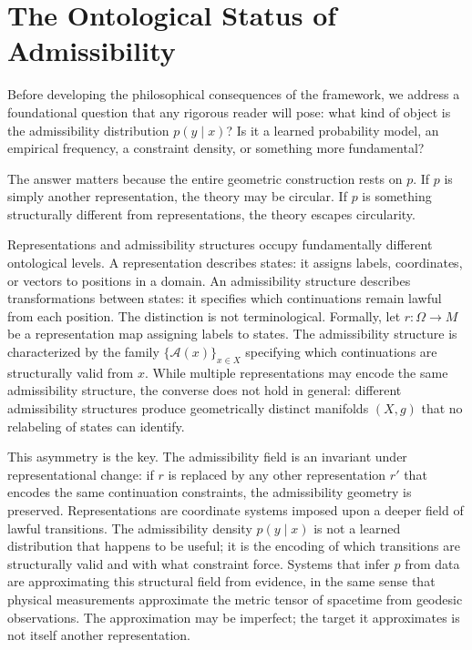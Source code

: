 \documentclass[12pt, oneside]{book}
\theoremstyle{plain-flyxion}
\theoremstyle{definition-flyxion}
\newcommand{\A}{\mathcal{A}}
\begin{document}
\section{The Ontological Status of Admissibility}

Before developing the philosophical consequences of the framework, we address a
foundational question that any rigorous reader will pose: what kind of object is the
admissibility distribution $p(y \mid x)$? Is it a learned probability model, an empirical
frequency, a constraint density, or something more fundamental?

The answer matters because the entire geometric construction rests on $p$. If $p$ is
simply another representation, the theory may be circular. If $p$ is something
structurally different from representations, the theory escapes circularity.

Representations and admissibility structures occupy fundamentally different ontological
levels. A representation describes states: it assigns labels, coordinates, or vectors to
positions in a domain. An admissibility structure describes transformations between states:
it specifies which continuations remain lawful from each position. The distinction is not
terminological. Formally, let $r: \Omega \to M$ be a representation map assigning labels
to states. The admissibility structure is characterized by the family $\{\A(x)\}_{x \in
X}$ specifying which continuations are structurally valid from $x$. While multiple
representations may encode the same admissibility structure, the converse does not hold
in general: different admissibility structures produce geometrically distinct manifolds
$(X, g)$ that no relabeling of states can identify.

This asymmetry is the key. The admissibility field is an invariant under representational
change: if $r$ is replaced by any other representation $r'$ that encodes the same
continuation constraints, the admissibility geometry is preserved. Representations are
coordinate systems imposed upon a deeper field of lawful transitions. The admissibility
density $p(y \mid x)$ is not a learned distribution that happens to be useful; it is the
encoding of which transitions are structurally valid and with what constraint force.
Systems that infer $p$ from data are approximating this structural field from evidence,
in the same sense that physical measurements approximate the metric tensor of spacetime
from geodesic observations. The approximation may be imperfect; the target it approximates
is not itself another representation.
\end{document}
